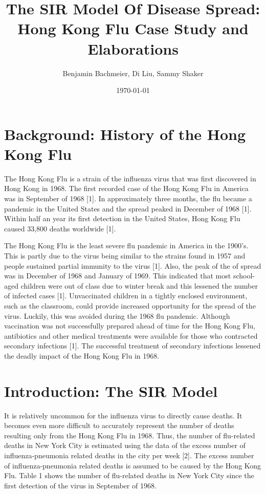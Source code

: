 \documentclass{article}
\title{The SIR Model Of Disease Spread: Hong Kong Flu Case Study and Elaborations}
\author{Benjamin Bachmeier, Di Liu, Sammy Shaker}
\date{\today}
\begin{document}
\maketitle

\section{Background: History of the Hong Kong Flu}
The Hong Kong Flu is a strain of the influenza virus that was first discovered in Hong Kong in 1968. The first recorded case of the Hong Kong Flu in America was in September of 1968 [1]. In approximately three months, the flu became a pandemic in the United States and the spread peaked in December of 1968 [1]. Within half an year its first detection in the United States, Hong Kong Flu caused 33,800 deaths worldwide [1]. 

The Hong Kong Flu is the least severe flu pandemic in America in the 1900’s. This is partly due to the virus being similar to the strains found in 1957 and people sustained partial immunity to the virus [1]. Also, the peak of the of spread was in December of 1968 and January of 1969. This indicated that most school-aged children were out of class due to winter break and this lessened the number of infected cases [1]. Unvaccinated children in a tightly enclosed environment, such as the classroom, could provide increased opportunity for the spread of the virus. Luckily, this was avoided during the 1968 flu pandemic. Although vaccination was not successfully prepared ahead of time for the Hong Kong Flu, antibiotics and other medical treatments were available for those who contracted secondary infections [1]. The successful treatment of secondary infections lessened the deadly impact of the Hong Kong Flu in 1968. 

\section{Introduction: The SIR Model}
It is relatively uncommon for  the influenza virus to directly cause deaths. It becomes even more difficult to accurately represent the number of deaths resulting only from the Hong Kong Flu in 1968. Thus, the number of flu-related deaths in New York City is estimated using the data of the excess number of influenza-pneumonia related deaths in the city per week [2]. The excess number of influenza-pneumonia related deaths is assumed to be caused by the Hong Kong Flu. Table 1 shows the number of flu-related deaths in New York City since the first detection of the virus in September of 1968.
\end{document}
